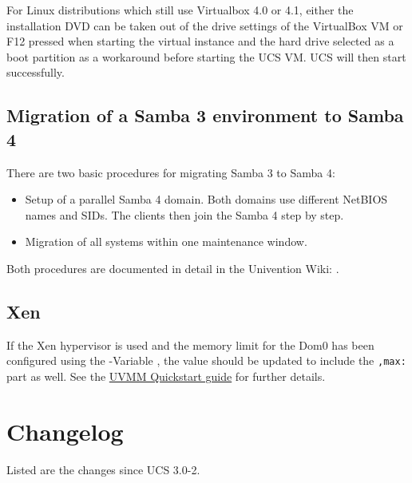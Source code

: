 For Linux distributions which still use Virtualbox 4.0 or 4.1, either
the installation DVD can be taken out of the drive settings of the
VirtualBox VM or F12 pressed when starting the virtual instance and
the hard drive selected as a boot partition as a workaround before
starting the UCS VM. UCS will then start successfully.

\section{Migration of a Samba 3 environment to Samba 4}
\label{samba-migration}

There are two basic procedures for migrating Samba 3 to Samba 4:

\begin{itemize}
\item Setup of a parallel Samba 4 domain. Both domains use different
NetBIOS names and SIDs. The clients then join the Samba 4 step by
step.
\item Migration of all systems within one maintenance window.
\end{itemize}

Both procedures are documented in detail in the Univention Wiki:
.

\section{Xen} %
If the Xen hypervisor is used and the memory limit for the Dom0 has been configured using the \ucsUCR{}-Variable , the value should be updated to include the \texttt{,max:} part as well.
See the \href{http://wiki.univention.de/index.php?title=UVMM_Quickstart-3.1/en#Configuring_the_Dom0}{UVMM Quickstart guide} for further details.

\chapter{Changelog}

Listed are the changes since UCS 3.0-2.






